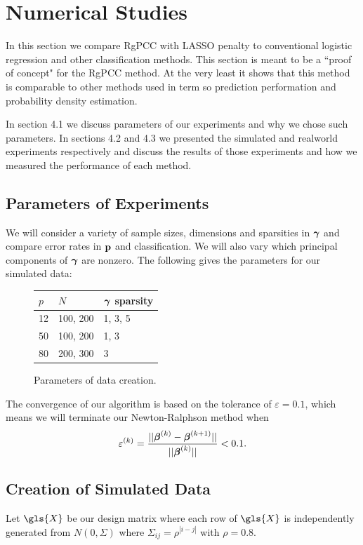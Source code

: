 \documentclass[main.tex]{subfiles}
\begin{document}
\section{Numerical Studies}
In this section we compare RgPCC with LASSO penalty to conventional logistic regression and other classification methods. This section is meant to be a ``proof of concept" for the RgPCC method. At the very least it shows that this method is comparable to other methods used in term so prediction performation and probability density estimation.

In section 4.1 we discuss parameters of our experiments and why we chose such parameters. In sections 4.2 and 4.3 we presented the simulated and realworld experiments respectively and discuss the results of those experiments and how we measured the performance of each method. 




\subsection{Parameters of Experiments}

We will consider a variety of sample sizes, dimensions and sparsities in $\boldsymbol \gamma$ and compare error rates in $\mathbf{p}$ and classification. We will also vary which principal components of $\boldsymbol \gamma$ are nonzero. The following gives the parameters for our simulated data:

\begin{figure}[H]
	\begin{tabular}{l l l} \hline
		$p$ & $N$ & $\boldsymbol \gamma$ sparsity \\ \hline
		\rowcolor{LightCyan}
		12 & 100, 200 & 1, 3, 5 \\
		50 & 100, 200 & 1, 3 \\
		\rowcolor{LightCyan}
		80 & 200, 300 & 3 \\ \hline
	\end{tabular}
	\caption{Parameters of data creation.}
	\label{figure:params}
\end{figure}

The convergence of our algorithm is based on the tolerance of $\varepsilon = 0.1$, which means we will terminate our Newton-Ralphson method when $$\varepsilon^{(k)} = \frac{||\boldsymbol \beta^{(k)} - \boldsymbol \beta^{(k+1)}||}{||\boldsymbol \beta^{(k)}||} < 0.1.$$

\subsection{Creation of Simulated Data}
Let $\gls{X}$ be our design matrix where each row of $\gls{X}$ is independently generated from $N(0, \Sigma)$ where $\Sigma_{ij} = \rho^{|i - j|}$ with $\rho = 0.8$.
\end{document}
